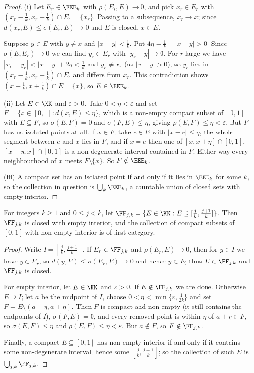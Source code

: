 \begin{proof}
	(i) Let $E_r\in\EEE_k$ with $\rho(E_r,E)\to0$, and pick $x_r\in E_r$ with $(x_r-\tfrac1k,x_r+\tfrac1k)\cap E_r = \{x_r\}$. Passing to a subsequence, $x_r\to x$; since $d(x_r,E)\leq\sigma(E_r,E)\to0$ and $E$ is closed, $x \in E$.

	Suppose $y \in E$ with $y\neq x$ and $|x-y|<\tfrac1k$. Put $4\eta = \tfrac1k-|x-y| > 0$. Since $\sigma(E,E_r)\to0$ we can find $y_r\in E_r$ with $|y_r-y|\to0$. For $r$ large we have $|x_r-y_r| < |x-y|+2\eta<\tfrac1k$ and $y_r\neq x_r$ (as $|x-y|>0$), so $y_r$ lies in $(x_r-\tfrac1k,x_r+\tfrac1k)\cap E_r$ and differs from $x_r$. This contradiction shows $(x-\tfrac1k,x+\tfrac1k)\cap E=\{x\}$, so $E\in\EEE_k$.

	(ii) Let $E\in\KK$ and $\varepsilon>0$. Take $0<\eta<\varepsilon$ and set $F = \{x\in[0,1] : d(x,E)\leq\eta\}$, which is a non-empty compact subset of $[0,1]$ with $E\subseteq F$, so $\sigma(E,F)=0$ and $\sigma(F,E)\leq\eta$, giving $\rho(E,F)\leq\eta<\varepsilon$. But $F$ has no isolated points at all: if $x\in F$, take $e\in E$ with $|x-e|\leq\eta$; the whole segment between $e$ and $x$ lies in $F$, and if $x = e$ then one of $[x,x+\eta]\cap[0,1]$, $[x-\eta,x]\cap[0,1]$ is a non-degenerate interval contained in $F$. Either way every neighbourhood of $x$ meets $F\setminus\{x\}$. So $F\notin\EEE_k$.

	(iii) A compact set has an isolated point if and only if it lies in $\EEE_k$ for some $k$, so the collection in question is $\bigcup_k\EEE_k$, a countable union of closed sets with empty interior.
\end{proof}

\begin{lemma}\label{lem:interior-first-cat}
	For integers $k\geq1$ and $0\leq j<k$, let $\FF_{j,k} = \{E\in\KK : E\supseteq[\tfrac jk,\tfrac{j+1}{k}]\}$. Then $\FF_{j,k}$ is closed with empty interior, and the collection of compact subsets of $[0,1]$ with non-empty interior is of first category.
\end{lemma}

\begin{proof}
	Write $I = [\tfrac jk,\tfrac{j+1}k]$. If $E_r\in\FF_{j,k}$ and $\rho(E_r,E)\to0$, then for $y \in I$ we have $y\in E_r$, so $d(y,E)\leq\sigma(E_r,E)\to0$ and hence $y \in E$; thus $E \in\FF_{j,k}$ and $\FF_{j,k}$ is closed.

	For empty interior, let $E\in\KK$ and $\varepsilon>0$. If $E\notin\FF_{j,k}$ we are done. Otherwise $E\supseteq I$; let $a$ be the midpoint of $I$, choose $0<\eta<\min\{\varepsilon,\tfrac1{2k}\}$ and set $F = E\setminus(a-\eta,a+\eta)$. Then $F$ is compact and non-empty (it still contains the endpoints of $I$), $\sigma(F,E)=0$, and every removed point is within $\eta$ of $a\pm\eta\in F$, so $\sigma(E,F)\leq\eta$ and $\rho(E,F)\leq\eta<\varepsilon$. But $a\notin F$, so $F\notin\FF_{j,k}$.

	Finally, a compact $E\subseteq[0,1]$ has non-empty interior if and only if it contains some non-degenerate interval, hence some $[\tfrac jk,\tfrac{j+1}k]$; so the collection of such $E$ is $\bigcup_{j,k}\FF_{j,k}$.
\end{proof}

